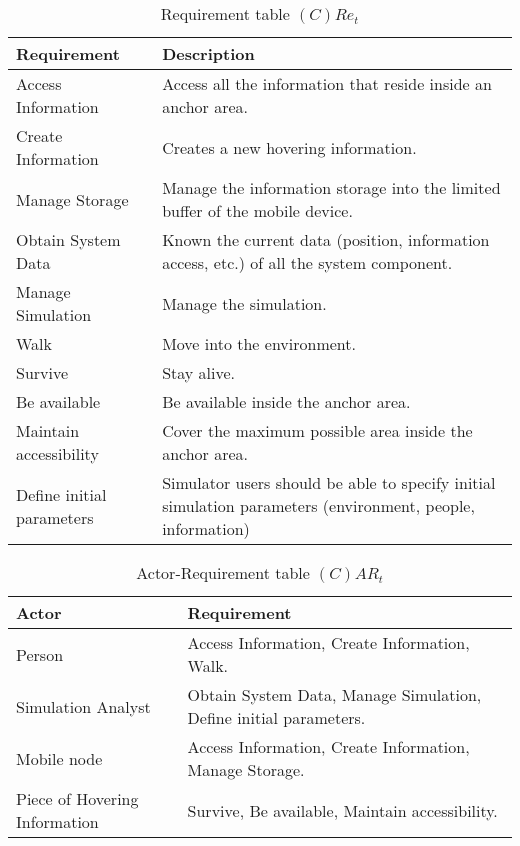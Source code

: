 \begin{table}[H]
	\centering
	\begin{tabular}{|p{4cm}|p{8cm}|}
			\hline
			\textbf{Requirement} & \textbf{Description} \\
			\hline
			Access Information & Access all the information that reside inside an
			anchor area. \\
			\hline
			Create Information & Creates a new hovering information. \\
			\hline
			Manage Storage & Manage the information storage into the limited buffer
			of the mobile device.  \\
			\hline
			Obtain System Data & Known the current data (position, information access,
			etc.) of all the system component. \\
			\hline
			Manage Simulation & Manage the simulation. \\
			\hline
			Walk & Move into the environment. \\
			\hline
			Survive & Stay alive. \\
			\hline
			Be available & Be available inside the anchor area. \\
			\hline
			Maintain accessibility & Cover the maximum possible area inside the
			anchor area. \\
			\hline
			Define initial parameters & Simulator users should be able to specify
			initial simulation parameters (environment, people, information) \\
			\hline
		\end{tabular}
	\caption{Requirement table $(C)Re_t$}
	\label{tab:cact}
\end{table}

\begin{table}[H]
	\centering
	\begin{tabular}{|p{4cm}|p{8cm}|}
			\hline
			\textbf{Actor} & \textbf{Requirement} \\
			\hline
			Person & Access Information, Create Information, Walk. \\
			\hline
			Simulation Analyst & Obtain System Data, Manage Simulation, Define
			initial parameters. \\
			\hline
			Mobile node & Access Information, Create Information, Manage Storage. \\
			\hline
			Piece of Hovering Information & Survive, Be available, Maintain
			accessibility. \\
			\hline
		\end{tabular}
	\caption{Actor-Requirement table $(C)AR_t$}
	\label{tab:cart}
\end{table}

